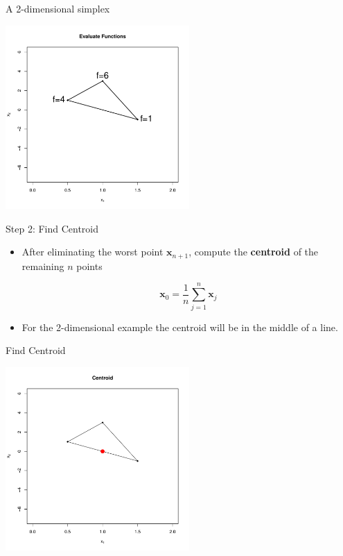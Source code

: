 \documentclass[10pt]{beamer}
\begin{document}
\begin{frame}{A 2-dimensional simplex}
  \begin{center}
    \includegraphics[height=7cm]{RCode/nmf.pdf}
  \end{center}
\end{frame}
\begin{frame}{Step 2: Find Centroid}
  \begin{itemize}
  \item After eliminating the worst point ${\bm x_{n+1}}$, compute the {\bf centroid} of the remaining $n$ points

    \begin{equation}
      {\bm x_0}=\frac{1}{n}\sum_{j=1}^{n}  {\bm x_j}
    \end{equation}

  \item For the 2-dimensional example the centroid will be in the middle of a line.
  \end{itemize}
\end{frame}
\begin{frame}{Find Centroid}
  \begin{center}
    \includegraphics[height=7cm]{RCode/nmcent.pdf}
  \end{center}
\end{frame}
\end{document}
